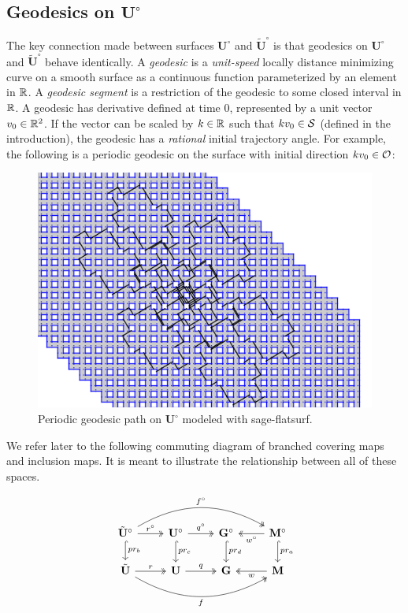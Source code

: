 \documentclass[]{article}
\def\bU{\mathbf{U}} \def\btU{\tilde{\bU}} \def\bUs{\bU^\circ}
\def\bG{\mathbf{G}} \def\bGs{\mathbf{G}^\circ}
\def\bM{\mathbf{M}}
\def\bMs{\mathbf{M}^\circ}
\def\btUs{\btU^\circ}
\begin{document}
\subsection{Geodesics on $\bUs$}
The key connection made between surfaces $\bUs$ and $\btUs$ is that geodesics on $\bUs$ and $\btUs$ behave identically. A \emph{geodesic} is a \emph{unit-speed} locally distance minimizing curve on a smooth surface as a continuous function parameterized by an element in $\mathbb{R}$. A \emph{geodesic segment} is a restriction of the geodesic to some closed interval in $\mathbb{R}$. A geodesic has derivative defined at time 0, represented by a unit vector $v_0\in\mathbb{R}^2$. If the vector can be scaled by $k\in\mathbb{R}$ such that $kv_0\in\mathcal{S}$ (defined in the introduction), the geodesic has a \emph{rational} initial trajectory angle. For example, the following is a periodic geodesic on the surface with initial direction $kv_0\in\mathcal{O}$:
\\
\begin{figure}[H]
\centering
\includegraphics[width=4in.]{closed2.png}
\caption{Periodic geodesic path on $\bUs$ modeled with sage-flatsurf.}
\label{fig:complicated}
\end{figure}

We refer later to the following commuting diagram of branched covering maps and inclusion maps. It is meant to illustrate the relationship between all of these spaces.

\begin{equation}
\begin{tikzcd}
\arrow[two heads, bend left]{rrr}{f^\circ}[swap]{} \arrow[hook]{d}{pr_b} \btUs \arrow[two heads]{r}{r^\circ} & \bUs \arrow[hook]{d}{pr_c} \arrow[two heads]{r}{q^\circ} & \bGs \arrow[hook]{d}{pr_d} &\arrow[two heads]{l}{w^\circ} \bMs \arrow[hook]{d}{pr_a}  \\
\arrow[two heads, bend right]{rrr}{}[swap]{f} \btU \arrow[two heads]{r}{r} & \bU \arrow[two heads]{r}{q} & \bG & \arrow[two heads]{l}{w}\bM  \\
\end{tikzcd}
\label{eq:commute}
\end{equation}
\end{document}
